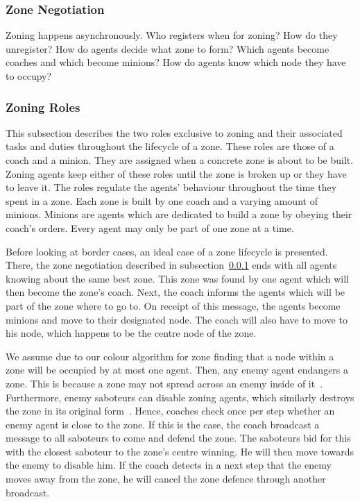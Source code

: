 \subsubsection{Zone Negotiation}\label{alg:zon_formation}
Zoning happens asynchronously. Who registers when for zoning? How do they unregister?
How do agents decide what zone to form? Which agents become coaches and which become minions? How do agents know which node they have to occupy?

\subsubsection{Zoning Roles}\label{alg:zon_roles}
This subsection describes the two roles exclusive to zoning and their associated tasks and duties throughout the lifecycle of a zone. These roles are those of a coach and a minion. They are assigned when a concrete zone is about to be built. Zoning agents keep either of these roles until the zone is broken up or they have to leave it. The roles regulate the agents' behaviour throughout the time they spent in a zone. Each zone is built by one coach and a varying amount of minions. Minions are agents which are dedicated to build a zone by obeying their coach's orders. Every agent may only be part of one zone at a time.

Before looking at border cases, an ideal case of a zone lifecycle is presented. There, the zone negotiation described in subsection~\ref{alg:zon_formation} ends with all agents knowing about the same best zone. This zone was found by one agent which will then become the zone's coach. Next, the coach informs the agents which will be part of the zone where to go to. On receipt of this message, the agents become minions and move to their designated node. The coach will also have to move to his node, which happens to be the centre node of the zone.

We assume due to our colour algorithm for zone finding that a node within a zone will be occupied by at most one agent. Then, any enemy agent endangers a zone. This is because a zone may not spread across an enemy inside of it~\cite{ahlbrecht_mapc_2014}. %
Furthermore, enemy saboteurs can disable zoning agents, which similarly destroys the zone in its original form~\cite{ahlbrecht_mapc_2014}. %
Hence, coaches check once per step whether an enemy agent is close to the zone. If this is the case, the coach broadcast a message to all saboteurs to come and defend the zone. The saboteurs bid for this with the closest saboteur to the zone's centre winning. He will then move towards the enemy to disable him. If the coach detects in a next step that the enemy moves away from the zone, he will cancel the zone defence through another broadcast.

